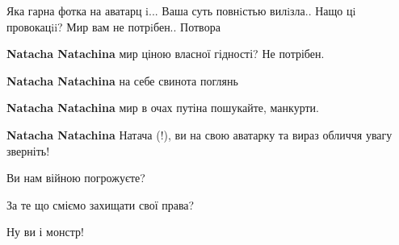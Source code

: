 \begin{itemize}
Яка гарна фотка на аватарц i... Ваша суть повнiстью вилiзла.. Нащо цi
провокацii? Мир вам не потрiбен.. Потвора


\begin{itemize}
 
\textbf{Natacha Natachina} мир ціною власної гідності? Не потрібен.

 
\textbf{Natacha Natachina} на себе свинота поглянь

 
\textbf{Natacha Natachina} мир в очах путіна пошукайте, манкурти.

 
\textbf{Natacha Natachina} Натача (!), ви на свою аватарку та вираз обличчя увагу зверніть!

 

Ви нам війною погрожуєте?

За те що сміємо захищати свої права?

Ну ви і монстр!
\end{itemize}

 

\end{itemize}
